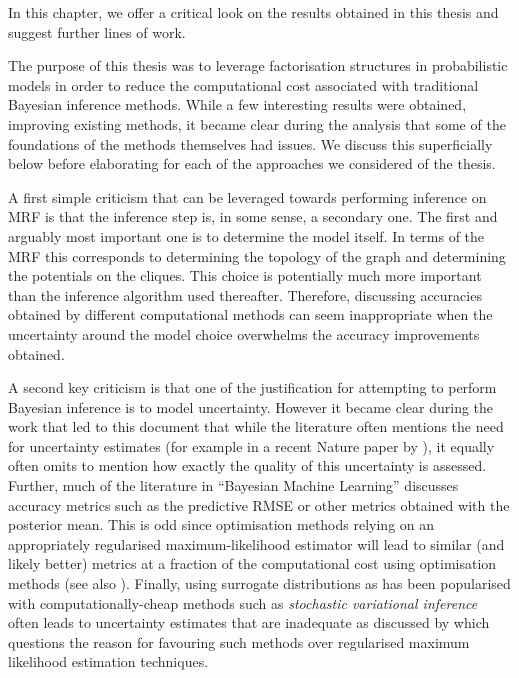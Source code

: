 
In this chapter, we offer a critical look on the results obtained in this thesis and suggest further lines of work.

The purpose of this thesis was to leverage factorisation structures in probabilistic models in order to reduce the computational cost associated with traditional Bayesian inference methods. While a few interesting results were obtained, improving existing methods, it became clear during the analysis that some of the foundations of the methods themselves had issues. We discuss this superficially below before elaborating for each of the approaches we considered of the thesis. 

A first simple criticism that can be leveraged towards performing inference on MRF is that the inference step is, in some sense, a secondary one. The first and arguably most important one is to determine the model itself. In terms of the MRF this corresponds to determining the topology of the graph and determining the potentials on the cliques. This choice is potentially much more important than the inference algorithm used thereafter. Therefore, discussing accuracies obtained by different computational methods can seem inappropriate when the uncertainty around the model choice overwhelms the accuracy improvements obtained. 

A second key criticism is that one of the justification for attempting to perform Bayesian inference is to model uncertainty. However it became clear during the work that led to this document that while the literature often mentions the need for uncertainty estimates (for example in a recent Nature paper by \citet{ghahramani15}), it equally often omits to mention how exactly the quality of this uncertainty is assessed. Further, much of the literature in ``Bayesian Machine Learning'' discusses accuracy metrics such as the predictive RMSE or other metrics obtained with the posterior mean. This is odd since optimisation methods relying on an appropriately regularised maximum-likelihood estimator will lead to similar (and likely better) metrics at a fraction of the computational cost using optimisation methods (see also \citet{green15}). %
Finally, using surrogate distributions as has been popularised with computationally-cheap methods such as \emph{stochastic variational inference} \citep{hoffman13} often leads to uncertainty estimates that are inadequate as discussed by \cite{wang05} which questions the reason for favouring such methods over regularised maximum likelihood estimation techniques.

